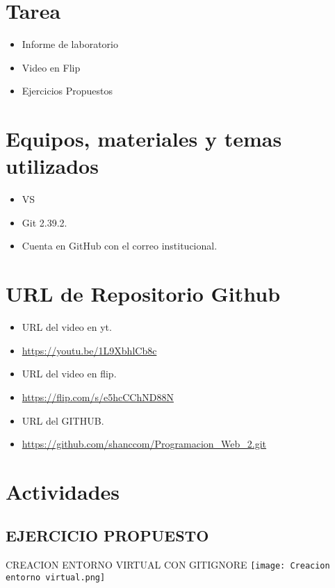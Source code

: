 \documentclass{article}
\begin{document}
	\section{Tarea}
	\begin{itemize}		
		\item Informe de laboratorio
            \item Video en Flip
		\item Ejercicios Propuestos
        
	\end{itemize}
		
	\section{Equipos, materiales y temas utilizados}
	\begin{itemize}
		\item VS
		\item Git 2.39.2.
		\item Cuenta en GitHub con el correo institucional.
	\end{itemize}
    \clearpage
    
	\section{URL de Repositorio Github}
	\begin{itemize}
        \item URL del video en yt.
		\item \url{https://youtu.be/1L9XbhlCb8c}
        \item URL del video en flip.
		\item \url{https://flip.com/s/e5hcCChND88N}
        \item URL del GITHUB.
            \item \url{https://github.com/shanccom/Programacion_Web_2.git}
	\end{itemize}
	
	\section{Actividades}
	\subsection{EJERCICIO PROPUESTO}
        \item CREACION ENTORNO VIRTUAL CON GITIGNORE
        \newline \newline
        \texttt{[image: Creacion entorno virtual.png]}
\end{document}
